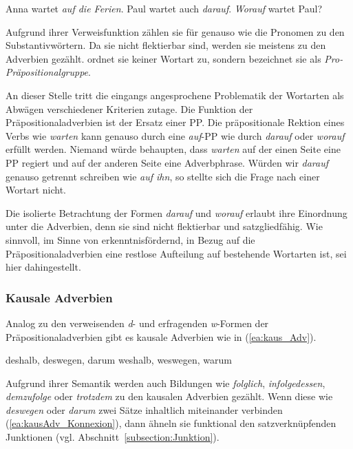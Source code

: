 \ea \label{ea:Präpositionaladverb}
\ea \label{ea:PP_auf} Anna wartet \textit{auf die Ferien}.
\ex \label{ex:PräpAdv_darauf} Paul wartet auch \textit{darauf}.
\ex \label{ex:PräpAdv_worauf} \textit{Worauf} wartet Paul?
\z 
\z 

Aufgrund ihrer Verweisfunktion zählen sie für \citet[308]{HelbigBuscha} genauso wie die Pronomen zu den Substantivwörtern. Da sie nicht flektierbar sind, werden sie meistens zu den Adverbien gezählt. \citet[220]{Agel2017} ordnet sie keiner Wortart zu, sondern bezeichnet sie als \textit{Pro-Präpositionalgruppe}. 

An dieser Stelle tritt die eingangs angesprochene Problematik der Wortarten als Abwägen verschiedener Kriterien zutage. Die Funktion der Präpositionaladverbien ist der Ersatz einer PP. Die präpositionale Rektion eines Verbs wie \textit{warten} kann genauso durch eine \textit{auf}-PP wie durch \textit{darauf} oder \textit{worauf} erfüllt werden. Niemand würde behaupten, dass \textit{warten} auf der einen Seite eine PP regiert und auf der anderen Seite eine Adverbphrase. Würden wir \textit{darauf} genauso getrennt schreiben wie \textit{auf ihn}, so stellte sich die Frage nach einer Wortart nicht. 

Die isolierte Betrachtung der Formen \textit{darauf} und \textit{worauf} erlaubt ihre Einordnung unter die Adverbien, denn sie sind nicht flektierbar und satzgliedfähig. Wie sinnvoll, im Sinne von erkenntnisfördernd, in Bezug auf die Präpositionaladverbien eine restlose Aufteilung auf bestehende Wortarten ist, sei hier dahingestellt.  


\subsubsection{Kausale Adverbien}\label{subsubsection:Kaus_Adverb}

Analog zu den verweisenden \textit{d}- und erfragenden \textit{w}-Formen der Präpositionaladverbien gibt es kausale Adverbien wie in (\ref{ea:kaus_Adv}).

\ea \label{ea:kaus_Adv}
\ea \label{ea:kaus_d_Adv} deshalb, deswegen, darum
\ex \label{ex:kaus_w_Adv} weshalb, weswegen, warum
\z 
\z 

Aufgrund ihrer Semantik werden auch Bildungen wie \textit{folglich}, \textit{infolgedessen}, \textit{demzufolge} oder \textit{trotzdem} zu den kausalen Adverbien gezählt. Wenn diese wie \textit{deswegen} oder \textit{darum} zwei Sätze inhaltlich miteinander verbinden (\ref{ea:kausAdv_Konnexion}), dann ähneln sie funktional den satzverknüpfenden Junktionen (vgl. Abschnitt~\ref{subsection:Junktion}).

